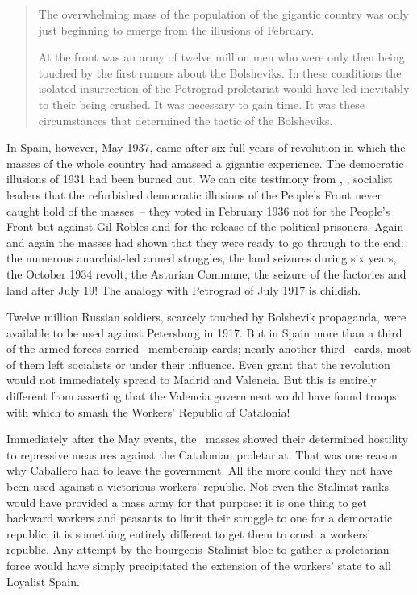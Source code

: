 \begin{quotation}
  The overwhelming mass of the population of the gigantic country was only just beginning to emerge from the illusions of February.
  
  At the front was an army of twelve million men who were only then being touched by the first rumors about the Bolsheviks. In these conditions the isolated insurrection of the Petrograd proletariat would have led inevitably to their being crushed. It was necessary to gain time. It was these circumstances that determined the tactic of the Bolsheviks.
\end{quotation}

In Spain, however, May 1937, came after six full years of revolution in which the masses of the whole country had amassed a gigantic experience. The democratic illusions of 1931 had been burned out. We can cite testimony from \CNT\kn, \POUM\kn, socialist leaders that the refurbished democratic illusions of the People’s Front never caught hold of the masses~-- they voted in February 1936 not for the People’s Front but against Gil-Robles and for the release of the political prisoners. Again and again the masses had shown that they were ready to go through to the end: the numerous anarchist-led armed struggles, the land seizures during six years, the October 1934 revolt, the Asturian Commune, the seizure of the factories and land after July 19! The analogy with Petrograd of July 1917 is childish.

Twelve million Russian soldiers, scarcely touched by Bolshevik propaganda, were available to be used against Petersburg in 1917. But in Spain more than a third of the armed forces carried \CNT\ membership cards; nearly another third \UGT\ cards, most of them left socialists or under their influence. Even grant that the revolution would not immediately spread to Madrid and Valencia. But this is entirely different from asserting that the Valencia government would have found troops with which to smash the Workers’ Republic of Catalonia!

Immediately after the May events, the \UGT\ masses showed their determined hostility to repressive measures against the Catalonian proletariat. That was one reason why Caballero had to leave the government. All the more could they not have been used against a victorious workers’ republic. Not even the Stalinist ranks would have provided a mass army for that purpose: it is one thing to get backward workers and peasants to limit their struggle to one for a democratic republic; it is something entirely different to get them to crush a workers’ republic. Any attempt by the bourgeois--Stalinist bloc to gather a proletarian force would have simply precipitated the extension of the workers’ state to all Loyalist Spain.

